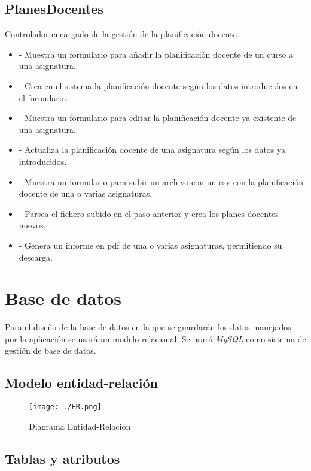 \subsection{PlanesDocentes}

Controlador encargado de la gestión de la planificación docente.

\begin{itemize}
\item {} - Muestra un formulario para añadir la planificación docente de un curso a una asignatura.
\item {} - Crea en el sistema la planificación docente según los datos introducidos en el formulario.
\item {} - Muestra un formulario para editar la planificación docente ya existente de una asignatura.
\item {} - Actualiza la planificación docente de una asignatura según los datos ya introducidos.
\item {} - Muestra un formulario para subir un archivo con un csv con la planificación docente de una o varias asignaturas.
\item {} - Parsea el fichero subido en el paso anterior y crea los planes docentes nuevos.
\item {} - Genera un informe en pdf de una o varias asignaturas, permitiendo su descarga.
\end{itemize}

\section{Base de datos}
Para el diseño de la base de datos en la que se guardarán los datos manejados por la aplicación se usará un modelo relacional. Se usará {\em MySQL} como sistema de gestión de base de datos. 
\subsection{Modelo entidad-relación}
\begin{figure}[H] 
  \label{diagrama-er} 
	\begin{center}
    \texttt{[image: ./ER.png]}
  \end{center}
\caption{Diagrama Entidad-Relación}
\end{figure}
\subsection{Tablas y atributos}

